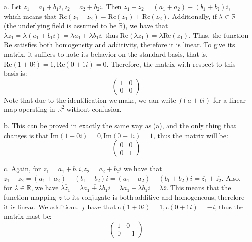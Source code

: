 \begin{solution}

    a. Let $z_1 = a_1 + b_1i, z_2 = a_2 + b_2i$. Then $z_1 + z_2 = (a_1+a_2) + (b_1+b_2)i$, which means that $\text{Re}(z_1+z_2) = \text{Re}(z_1) + \text{Re}(z_2)$. Additionally, if $\lambda \in \mathbb{R}$ (the underlying field is assumed to be $\mathbb{R}$), we have that $\lambda z_1 = \lambda(a_1 + b_1i) = \lambda a_1 + \lambda b_1 i$, thus $\text{Re}(\lambda z_1) = \lambda \text{Re}(z_1)$. Thus, the function Re satisfies both homogeneity and additivity, therefore it is linear. To give its matrix, it suffices to note its behavior on the standard basis, that is, $\text{Re}(1 + 0i) = 1, \text{Re}(0 + 1i) = 0$. Therefore, the matrix with respect to this basis is:
    $$\begin{pmatrix}
        1 & 0 \\ 0 & 0
    \end{pmatrix}$$
    Note that due to the identification we make, we can write $f(a+bi)$ for a linear map operating in $\mathbb{R}^2$ without confusion.
    
    b. This can be proved in exactly the same way as (a), and the only thing that changes is that $\text{Im}(1+0i) = 0, \text{Im}(0+1i) = 1$, thus the matrix will be:
    $$\begin{pmatrix}
        0 & 0 \\ 0 & 1
    \end{pmatrix}$$

    c. Again, for $z_1 = a_1 + b_1i, z_2 = a_2 + b_2i$ we have that $\overline{z_1+z_2} = \overline{(a_1+a_2)+(b_1+b_2)i} = (a_1+a_2)-(b_1+b_2)i = \overline{z_1} + \overline{z_2}$. Also, for $\lambda \in \mathbb{R}$, we have $\overline{\lambda z_1} = \overline{\lambda a_1 + \lambda b_1 i} = \lambda a_1 - \lambda b_1 i = \lambda \overline{z}$. This means that the function mapping $z$ to its conjugate is both additive and homogeneous, therefore it is linear. We additionally have that $c(1+0i) = 1, c(0+1i) = -i$, thus the matrix must be:
    $$\begin{pmatrix}
        1 & 0 \\ 0 & -1
    \end{pmatrix}$$


\end{solution}

